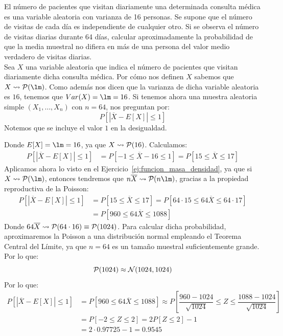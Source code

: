 \begin{ejercicio}
    El número de pacientes que visitan diariamente una determinada consulta médica es una variable aleatoria con varianza de 16 personas. Se supone que el número de visitas de cada día es independiente de cualquier otro. Si se observa el número de visitas diarias durante 64 días, calcular aproximadamente la probabilidad de que la media muestral no difiera en más de una persona del valor medio verdadero de visitas diarias.\\

    \noindent
    Sea $X$ una variable aleatoria que indica el número de pacientes que visitan diariamente dicha consulta médica. Por cómo nos definen $X$ sabemos que $X\rightsquigarrow\cc{P}(\lm)$. Como además nos dicen que la varianza de dicha variable aleatoria es $16$, tenemos que $Var(X) = \lm = 16$. Si tenemos ahora una muestra aleatoria simple $(X_1, \ldots, X_n)$ con $n=64$, nos preguntan por:
    \begin{equation*}
        P[|\overline{X} - E[X]| \leq 1]
    \end{equation*}
    Notemos que se incluye el valor $1$ en la desigualdad.

    Donde $E[X] = \lm = 16$, ya que $X\rightsquigarrow\mathcal{P}(16)$. Calculamos:
    \begin{align*}
        P[|\overline{X} - E[X]| \leq 1] &= P[-1 \leq \overline{X}-16 \leq 1] = P[15 \leq \overline{X} \leq 17]
    \end{align*}
    Aplicamos ahora lo visto en el Ejercicio~\ref{ej:funcion_masa_densidad}, ya que si $X\rightsquigarrow\cc{P}(\lm)$, entonces tendremos que $n\overline{X}\rightsquigarrow \cc{P}(n\lm)$, gracias a la propiedad reproductiva de la Poisson:
    \begin{align*}
        P[|\overline{X} - E[X]| \leq 1] &= P[15 \leq \overline{X} \leq 17] = P[64\cdot 15 \leq 64\overline{X}\leq 64\cdot 17] \\
                                     &= P[960 \leq 64\overline{X} \leq 1088]
    \end{align*}
    Donde $64\overline{X}\rightsquigarrow\mathcal{P}(64\cdot 16) \equiv \mathcal{P}(1024)$. Para calcular dicha probabilidad, aproximaremos la Poisson a una distribución normal empleando el Teorema Central del Límite, ya que $n=64$ es un tamaño muestral suficientemente grande. Por lo que:
    \begin{equation*}
        \mathcal{P}(1024) \approx \mathcal{N}(1024, 1024)
    \end{equation*}
    Por lo que:
    \begin{align*}
        P[|\overline{X} - E[X]| \leq 1] &= P[960 \leq 64\overline{X} \leq 1088] \approx P\left[\dfrac{960-1024}{\sqrt{1024}} \leq Z \leq \dfrac{1088 - 1024}{\sqrt{1024}}\right] \\
                                     &= P[-2 \leq Z \leq 2] = 2P[Z\leq 2] -1  \\
                                     &= 2\cdot 0.97725 - 1 = 0.9545
    \end{align*}
\end{ejercicio}

